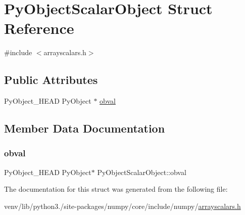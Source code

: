 \hypertarget{structPyObjectScalarObject}{}\section{Py\+Object\+Scalar\+Object Struct Reference}
\label{structPyObjectScalarObject}


{\ttfamily \#include $<$arrayscalars.\+h$>$}

\subsection*{Public Attributes}
\begin{DoxyCompactItemize}
\item 
Py\+Object\+\_\+\+H\+E\+AD Py\+Object $\ast$ \hyperlink{structPyObjectScalarObject_a2ca55faccab9f5bd81f36ffe1cef278e}{obval}
\end{DoxyCompactItemize}


\subsection{Member Data Documentation}
\mbox{\label{structPyObjectScalarObject_a2ca55faccab9f5bd81f36ffe1cef278e}} 
\subsubsection{\texorpdfstring{obval}{obval}}
{\footnotesize\ttfamily Py\+Object\+\_\+\+H\+E\+AD Py\+Object$\ast$ Py\+Object\+Scalar\+Object\+::obval}



The documentation for this struct was generated from the following file\+:\begin{DoxyCompactItemize}
\item 
venv/lib/python3./site-\/packages/numpy/core/include/numpy/\hyperlink{arrayscalars_8h}{arrayscalars.\+h}\end{DoxyCompactItemize}
